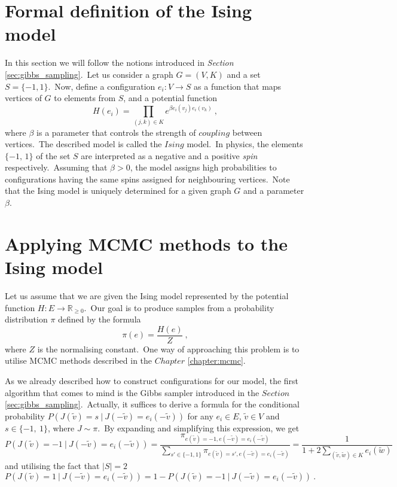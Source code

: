 \documentclass[shortabstract, english, lic]{iithesis}
\theoremstyle{default_theorem_style}\newtheorem{theorem}{Theorem}
\theoremstyle{default_theorem_style}\newtheorem{definition}{Definition}
\begin{document}
\section{Formal definition of the Ising model}

In this section we will follow the notions introduced in \textit{Section} \ref{sec:gibbs_sampling}.\ Let us consider
a graph $G = (V, K)$ and a set $S = \{-1, 1\}$.\ Now, define a configuration $e_i : V \to S$ as a function that
maps vertices of $G$ to elements from $S$, and a potential function
$$
H(e_i) = \prod\limits_{(j, k) \in K} e^{\beta e_i(v_j)e_i(v_k)}\ ,
$$
where $\beta$ is a parameter that controls the strength of $coupling$ between vertices.\ The described model
is called the $Ising$ model.\ In physics, the elements $\{-1, \, 1\}$ of the set $S$ are interpreted as a negative and a
positive \textit{spin} respectively.\ Assuming that $\beta > 0$, the model assigns high probabilities to configurations
having the same spins assigned for neighbouring vertices.\ Note that the Ising model is uniquely determined for
a given graph $G$ and a parameter $\beta$.

\section{Applying MCMC methods to the Ising model}

Let us assume that we are given the Ising model represented by the potential function
$H : E \to \mathbb R_{\geq 0}$.\ Our goal is to produce samples from a probability distribution $\pi$ defined by
the formula
$$
\pi(e) = \frac{H(e)}{Z}\ ,
$$
where $Z$ is the normalising constant.\ One way of approaching this problem is to utilise MCMC methods described in
the $Chapter$ \ref{chapter:mcmc}.\newline

\noindent As we already described how to construct configurations for our model, the first algorithm that comes to mind
is the Gibbs sampler introduced in the $Section$ \ref{sec:gibbs_sampling}.\ Actually, it suffices to derive a formula
for the conditional probability $P(J(\tilde{v}) = s\ |\ J(-\tilde{v})=e_i(-\tilde{v}))$ for any $e_i \in E$,
$\tilde{v} \in V$ and $s \in \{-1,\ 1\}$, where $J \sim \pi$.\ By expanding and simplifying this expression, we get
$$
P(J(\tilde{v}) = -1\ |\ J(-\tilde{v})=e_i(-\tilde{v})) =
\frac{\pi_{e(\tilde{v}) =
-1,e(-\tilde{v}) = e_i(-\tilde{v})}}
{\sum\limits_{s' \in \{-1, 1\}} \pi_{e(\tilde{v}) = s', e(-\tilde{v}) = e_i(-\tilde{v})}} =
\frac{1}{1 + 2 \sum\limits_{(\tilde{v}, \tilde{w}) \in K} e_i(\tilde{w})}
$$
and utilising the fact that $|S| = 2$
$$
P(J(\tilde{v}) = 1\ |\ J(-\tilde{v})=e_i(-\tilde{v})) = 1 - P(J(\tilde{v}) = -1\ |\ J(-\tilde{v})=e_i(-\tilde{v}))\ .
$$
\end{document}

